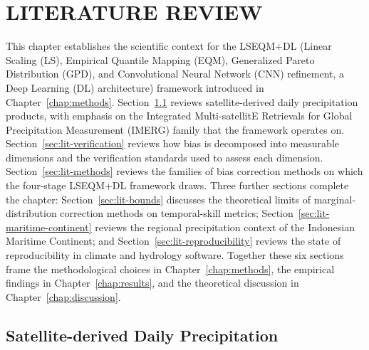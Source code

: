 %

\chapter{LITERATURE REVIEW}\label{chap:litreview}

This chapter establishes the scientific context for the
LSEQM+DL (Linear Scaling (LS), Empirical Quantile Mapping (EQM), 
Generalized Pareto Distribution (GPD), and Convolutional Neural Network (CNN) 
refinement, a Deep Learning (DL) architecture) framework introduced 
in Chapter~\ref{chap:methods}.
Section~\ref{sec:lit-imerg} reviews satellite-derived daily
precipitation products, with emphasis on the Integrated
Multi-satellitE Retrievals for Global Precipitation Measurement
(IMERG) family that the framework operates on.
Section~\ref{sec:lit-verification} reviews how bias is decomposed
into measurable dimensions and the verification standards used
to assess each dimension. Section~\ref{sec:lit-methods} reviews
the families of bias correction methods on which the four-stage
LSEQM+DL framework draws. Three further sections complete the
chapter: Section~\ref{sec:lit-bounds} discusses the theoretical
limits of marginal-distribution correction methods on
temporal-skill metrics; Section~\ref{sec:lit-maritime-continent}
reviews the regional precipitation context of the Indonesian
Maritime Continent; and Section~\ref{sec:lit-reproducibility}
reviews the state of reproducibility in climate and hydrology
software. Together these six sections frame the methodological
choices in Chapter~\ref{chap:methods}, the empirical findings in
Chapter~\ref{chap:results}, and the theoretical discussion in
Chapter~\ref{chap:discussion}.


\section{Satellite-derived Daily Precipitation}\label{sec:lit-imerg}


